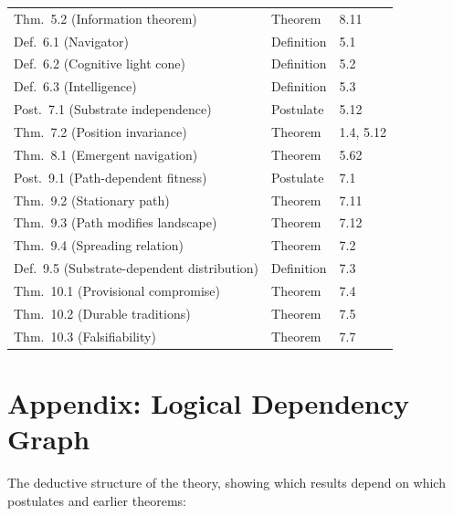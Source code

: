 \documentclass[11pt, a4paper]{article}
\theoremstyle{definition}
\theoremstyle{plain}
\theoremstyle{remark}
\begin{document}
\begin{longtable}{@{}lll@{}}
Thm.~5.2 (Information theorem) & Theorem & 8.11 \\
\addlinespace
Def.~6.1 (Navigator) & Definition & 5.1 \\
Def.~6.2 (Cognitive light cone) & Definition & 5.2 \\
Def.~6.3 (Intelligence) & Definition & 5.3 \\
\addlinespace
Post.~7.1 (Substrate independence) & Postulate & 5.12 \\
Thm.~7.2 (Position invariance) & Theorem & 1.4, 5.12 \\
\addlinespace
Thm.~8.1 (Emergent navigation) & Theorem & 5.62 \\
\addlinespace
Post.~9.1 (Path-dependent fitness) & Postulate & 7.1 \\
Thm.~9.2 (Stationary path) & Theorem & 7.11 \\
Thm.~9.3 (Path modifies landscape) & Theorem & 7.12 \\
Thm.~9.4 (Spreading relation) & Theorem & 7.2 \\
Def.~9.5 (Substrate-dependent distribution) & Definition & 7.3 \\
\addlinespace
Thm.~10.1 (Provisional compromise) & Theorem & 7.4 \\
Thm.~10.2 (Durable traditions) & Theorem & 7.5 \\
Thm.~10.3 (Falsifiability) & Theorem & 7.7 \\
\end{longtable}


\newpage
\section*{Appendix: Logical Dependency Graph}

The deductive structure of the theory, showing which results depend on
which postulates and earlier theorems:
\end{document}
